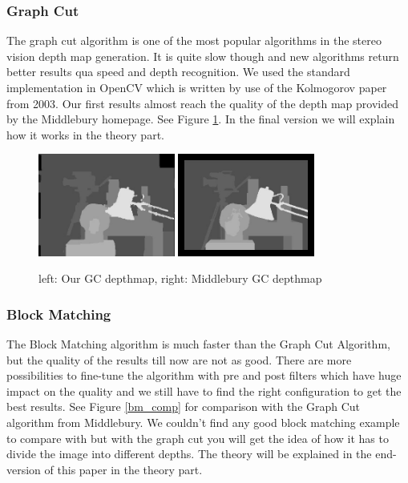 \documentclass[a4paper]{article}
\begin{document}
\subsubsection{Graph Cut}
The graph cut algorithm is one of the most popular algorithms in the
stereo vision depth map generation. It is quite slow though and new
algorithms return better results qua speed and depth recognition. We
used the standard implementation in OpenCV which is written by use of
the Kolmogorov paper from 2003\cite{kolmogorov2003}. Our first results
almost reach the quality of the depth map provided by the Middlebury
homepage\cite{middlebury}. See Figure \ref{gc_comp}. In the final
version we will explain how it works in the theory part. %

\begin{figure} [h!tb]
  \centering
  \includegraphics[width=0.4\textwidth]{gc_tsukuba_own}
  \includegraphics[width=0.4\textwidth]{disp_tsukuba_orig}
  \caption{left: Our GC depthmap, right: Middlebury GC depthmap}
  \label{gc_comp}
\end{figure}

\subsubsection{Block Matching}
The Block Matching algorithm is much faster than the Graph Cut
Algorithm, but the quality of the results till now are not as good.
There are more possibilities to fine-tune the algorithm with pre and
post filters which have huge impact on the quality and we still have
to find the right configuration to get the best results. See Figure
\ref{bm_comp} for comparison with the Graph Cut algorithm from
Middlebury. We couldn't find any good block matching example to
compare with but with the graph cut you will get the idea of how it
has to divide the image into different depths. The theory will be
explained in the end-version of this paper in the theory
part. %
\end{document}
